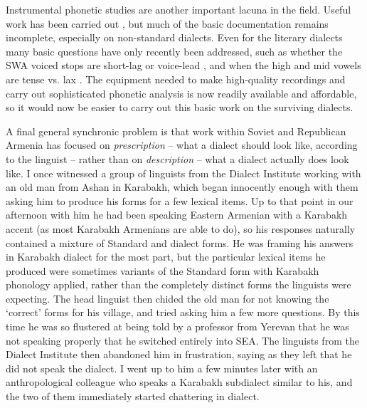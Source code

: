 \documentclass[output=paper]{langscibook}
\begin{document}
Instrumental phonetic studies are another important lacuna in the field. Useful work has been carried out \citep{Adjarian-1899-ArmenianExplosives,allen-1950-notesPhoneticsEasternArmenianSpeaker,Khachatryan-1988-ArmenianPhono,LadefogedMaddieson-1996-soundsWordldsLanguage,Hacopian-2003-ThreeWayVOTCOntrastArmenian,Amirian-2017-TehraniStudyAcousticFeaturesStopsAffricatesEasternArmenian,Toparlak-2017-MAConsonantsArmenian,Toparlak-2019-MAArmenianPhonetics,Seyfarth-2018-PlosiveVoicingAcousticsArmenian,kellyKeshishian-2019-voicingStopsAffricatesArmenianLebanon,kellyKeshishian-2021-VoicingWesternArmenian,ToparlakDolatian-202x-IntonationFocusMarkingWesternArmenian,ToparlakDolatian-2023-AerodynamicsarticulationwordfinalejectivesEasternArmenian,Seyfarth-JIPAArmenian}, but much of the basic documentation remains incomplete, especially on non-standard dialects.  Even for the literary dialects many basic questions have only recently been addressed, such as whether the SWA  voiced  stops are short-lag or voice-lead \citep{kellyKeshishian-2021-VoicingWesternArmenian}, and when the high and mid vowels are tense vs. lax \citep{Seyfarth-JIPAArmenian}.  The equipment needed to make high-quality recordings and carry out sophisticated phonetic analysis is now readily available and affordable, so it would now be easier to carry out this basic work on the surviving dialects.

A final general synchronic problem is that work within Soviet and Republican Armenia has focused on \textit{prescription} --  what a dialect should look like, according to the linguist -- rather than on \textit{description} -- what a dialect actually does look like. I once witnessed a group of linguists from the Dialect Institute working with an old man from Ashan in Karabakh, which began innocently enough with them asking him to produce his forms for a few lexical items. Up to that point in our afternoon with him he had been speaking Eastern Armenian with a Karabakh accent (as most Karabakh Armenians are able to do), so his responses naturally contained a mixture of Standard and dialect forms.   He was framing his answers in Karabakh dialect for the most part, but the particular lexical items he produced were sometimes variants of the Standard form with Karabakh phonology applied, rather than the completely distinct forms the linguists were expecting.  The head linguist then chided the old man for not knowing the `correct' forms for his village, and tried asking him a few more questions. By this time he was so flustered at being told by a professor from Yerevan that he was not speaking properly that he switched entirely into SEA. The linguists from the Dialect Institute then abandoned him in frustration, saying as they left that he did not speak the dialect.  I went up to him a few minutes later with an anthropological colleague who speaks a Karabakh subdialect similar to his, and the two of them immediately started chattering in dialect. 
\end{document}
